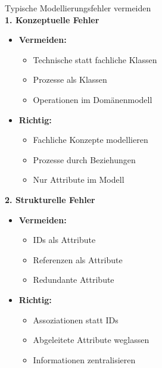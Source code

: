 \begin{KR}{Typische Modellierungsfehler vermeiden}\\
\textbf{1. Konzeptuelle Fehler}
\begin{itemize}
    \item \textbf{Vermeiden:}
    \begin{itemize}
        \item Technische statt fachliche Klassen
        \item Prozesse als Klassen
        \item Operationen im Domänenmodell
    \end{itemize}
    
    \item \textbf{Richtig:}
    \begin{itemize}
        \item Fachliche Konzepte modellieren
        \item Prozesse durch Beziehungen
        \item Nur Attribute im Modell
    \end{itemize}
\end{itemize}

\textbf{2. Strukturelle Fehler}
\begin{itemize}
    \item \textbf{Vermeiden:}
    \begin{itemize}
        \item IDs als Attribute
        \item Referenzen als Attribute
        \item Redundante Attribute
    \end{itemize}
    
    \item \textbf{Richtig:}
    \begin{itemize}
        \item Assoziationen statt IDs
        \item Abgeleitete Attribute weglassen
        \item Informationen zentralisieren
    \end{itemize}
\end{itemize}
\end{KR}

